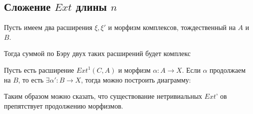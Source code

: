 \documentclass[../main.tex]{subfiles}
\begin{document}
\subsection{Сложение $Ext$ длины $n$}
Пусть имеем два расширения $\xi, \xi'$ и морфизм комплексов, тождественный на $A$ и $B$.
\bee
{}
\eee
Тогда суммой по Бэру двух таких расширений будет комплекс
\bee
{}
\eee
Пусть есть расширение $Ext^1(C, A)$ и морфизм $\alpha\colon A\rightarrow X$. Если $\alpha$ продолжаем на $B$, то есть $\exists \alpha' \colon B \rightarrow X$, тогда можно построить диаграмму:
\bee
{}
\eee
Таким образом можно сказать, что существование нетривиальных $Ext$' ов препятствует продолжению морфизмов.
\end{document}

